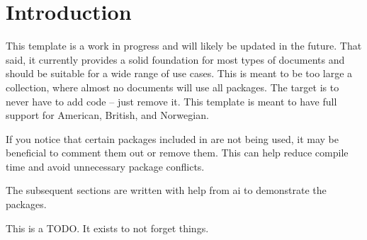 \section{Introduction}

This template is a work in progress and will likely be updated in the future. That said, it currently provides a solid foundation for most types of documents and should be suitable for a wide range of use cases. This is meant to be too large a collection, where almost no documents will use all packages. The target is to never have to add code \--- just remove it. This template is meant to have full support for American, British, and Norwegian.

If you notice that certain packages included in  are not being used, it may be beneficial to comment them out or remove them. This can help reduce compile time and avoid unnecessary package conflicts.

The subsequent sections are written with help from \gls{ai} to demonstrate the packages.

This is a TODO. It exists to not forget things.

